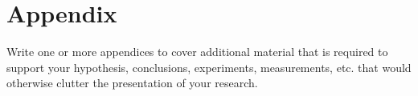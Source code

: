 \chapter{Appendix}\label{appendix}
Write one or more appendices to cover additional material that is required to support your
hypothesis, conclusions, experiments, measurements, etc. that would otherwise
clutter the presentation of your research.
